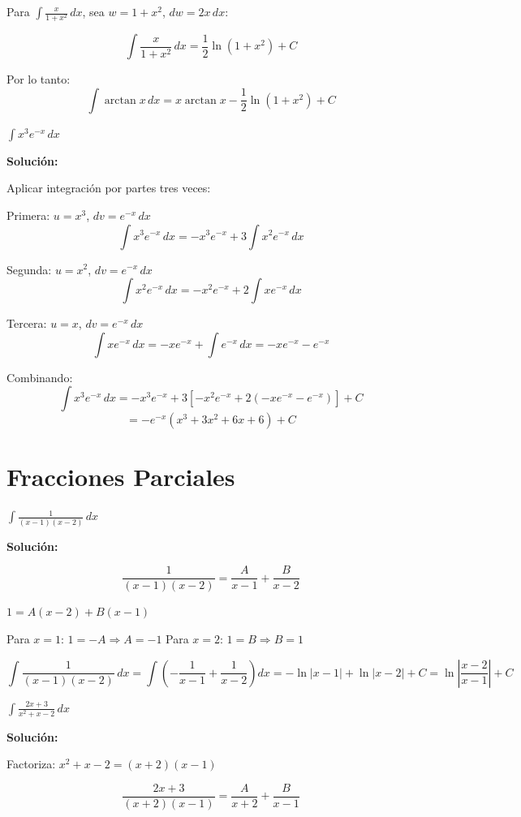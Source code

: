 \documentclass[12pt, a4paper]{book}
\begin{document}
Para $\int \frac{x}{1+x^2} \, dx$, sea $w = 1+x^2$, $dw = 2x \, dx$:

\[
\int \frac{x}{1+x^2} \, dx = \frac{1}{2}\ln(1+x^2) + C
\]

Por lo tanto:
\[
\int \arctan x \, dx = x\arctan x - \frac{1}{2}\ln(1+x^2) + C
\]

\begin{ejercicio}
$\int x^3 e^{-x} \, dx$
\end{ejercicio}

\textbf{Solución:}

Aplicar integración por partes tres veces:

Primera: $u = x^3$, $dv = e^{-x} \, dx$
\[
\int x^3 e^{-x} \, dx = -x^3 e^{-x} + 3\int x^2 e^{-x} \, dx
\]

Segunda: $u = x^2$, $dv = e^{-x} \, dx$
\[
\int x^2 e^{-x} \, dx = -x^2 e^{-x} + 2\int x e^{-x} \, dx
\]

Tercera: $u = x$, $dv = e^{-x} \, dx$
\[
\int x e^{-x} \, dx = -x e^{-x} + \int e^{-x} \, dx = -x e^{-x} - e^{-x}
\]

Combinando:
\[
\int x^3 e^{-x} \, dx = -x^3 e^{-x} + 3[-x^2 e^{-x} + 2(-x e^{-x} - e^{-x})] + C
\]
\[
= -e^{-x}(x^3 + 3x^2 + 6x + 6) + C
\]

\section{Fracciones Parciales}

\begin{ejercicio}
$\int \frac{1}{(x-1)(x-2)} \, dx$
\end{ejercicio}

\textbf{Solución:}

\[
\frac{1}{(x-1)(x-2)} = \frac{A}{x-1} + \frac{B}{x-2}
\]

$1 = A(x-2) + B(x-1)$

Para $x = 1$: $1 = -A \Rightarrow A = -1$
Para $x = 2$: $1 = B \Rightarrow B = 1$

\[
\int \frac{1}{(x-1)(x-2)} \, dx = \int \left(-\frac{1}{x-1} + \frac{1}{x-2}\right) dx = -\ln|x-1| + \ln|x-2| + C = \ln\left|\frac{x-2}{x-1}\right| + C
\]

\begin{ejercicio}
$\int \frac{2x+3}{x^2+x-2} \, dx$
\end{ejercicio}

\textbf{Solución:}

Factoriza: $x^2+x-2 = (x+2)(x-1)$

\[
\frac{2x+3}{(x+2)(x-1)} = \frac{A}{x+2} + \frac{B}{x-1}
\]
\end{document}
